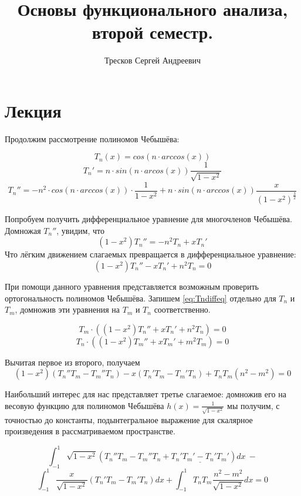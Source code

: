 \documentclass[12pt]{article}
\begin{document}
	\title{Основы функционального анализа, второй семестр.}
	\author{Тресков Сергей Андреевич}
	\maketitle
	
	\section{Лекция}
	
	Продолжим рассмотрение полиномов Чебышёва:
	
	$$ T_n(x) = cos(n \cdot arccos(x)) $$
	$$ T_n' = n \cdot sin(n \cdot arcos(x)) \frac{1}{\sqrt{1-x^2}} $$
	$$ T_n'' = -n^2 \cdot cos(n \cdot arccos(x)) \cdot \frac{1}{1-x^2} + n \cdot sin(n \cdot arccos(x)) \frac{x}{(1-x^2)^{\frac{3}{2}}} $$
	
	Попробуем получить дифференциальное уравнение для многочленов Чебышёва. Домножая $T_n''$, увидим, что
	$$ (1-x^2) T_n'' = -n^2 T_n + x T_n' $$
	Что лёгким движением слагаемых превращается в дифференциальное уравнение:
	\begin{equation} \label{eq:Tndiffeq}
		(1-x^2) T_n'' - x T_n' + n^2 T_n = 0
	\end{equation}
	
	При помощи данного уравнения представляется возможным проверить ортогональность полиномов Чебышёва. Запишем \eqref{eq:Tndiffeq}
	отдельно для $T_n$ и $T_m$, домножив эти уравнения на $T_m$ и $T_n$ соответственно.
	
	$$ T_m \cdot ( (1-x^2)T_n'' +  x T_n' + n^2 T_n) = 0 $$
	$$ T_n \cdot ( (1-x^2)T_m'' +  x T_m' + m^2 T_m) = 0 $$
	
	Вычитая первое из второго, получаем 
	$$ (1-x^2)(T_n'' T_m - T_m'' T_n) - x(T_n' T_m - T_m' T_n) + T_n T_m (n^2 - m^2) = 0 $$
	
	Наибольший интерес для нас представляет третье слагаемое: домножив его на весовую функцию для полиномов Чебышёва 
	$h(x) = \frac{1}{\sqrt{1-x^2}}$ мы получим, с точностью до константы, подынтегральное выражение для скалярное произведения
	в рассматриваемом пространстве.
	
	$$ \int_{-1}^1 \sqrt{1-x^2} (T_n'' T_m - T_m'' T_n + \underline{T_n'T_m' - T_n'T_m'}) dx \: - $$
	$$ \int_{-1}^1 \frac{x}{\sqrt{1-x^2}} (T_n' T_m - T_m' T_n) dx +
	   \int_{-1}^1 T_n T_m \frac{n^2 - m^2}{\sqrt{1-x^2}} dx = 0 $$
\end{document}

